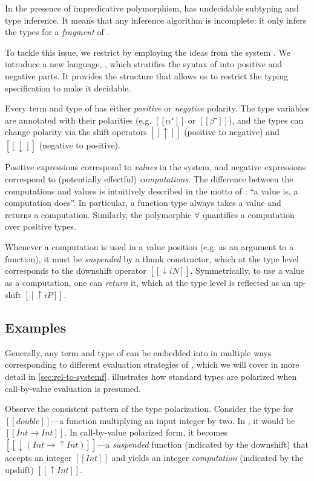 \label{sec:overview}

In the presence of impredicative polymorphism, \systemf has
undecidable subtyping and type inference. It means that any inference algorithm
is incomplete: it only infers the types for a \emph{fragment} of \systemf. 

To tackle this issue, we restrict \systemf by employing the ideas from the \CBPV
system \cite{levy2006:cbpv}. We introduce a new language, \fexists, which
stratifies the syntax of \systemf into positive and negative parts. It provides
the structure that allows us to restrict the typing specification to make it
decidable.

Every term and type of \fexists has either \emph{positive} or \emph{negative}
polarity. The type variables are annotated with their polarities (e.g. $[[α⁺]]$
or $[[β⁻]]$), and the types can change polarity via the shift operators $[[↑]]$
(positive to negative) and $[[↓]]$ (negative to positive).

Positive expressions correspond to \emph{values} in the \CBPV system, and
negative expressions correspond to (potentially effectful) \emph{computations}.
The difference between the computations and values is intuitively described in
the motto of \CBPV: ``a value is, a computation does''. In particular, a
function type always takes a value and returns a computation. Similarly, the
polymorphic $\forall$ quantifies a computation over positive types. 

Whenever a computation is used in a value position (e.g. as an argument to a
function), it must be \emph{suspended} by a thunk constructor, which at the
type level corresponds to the downshift operator $[[↓iN]]$.
Symmetrically, to use a value as a computation, one can \emph{return} it,
which at the type level is reflected as an up-shift $[[↑iP]]$.

\subsection{Examples}

Generally, any term and type of \systemf can be embedded into \fexists in
multiple ways corresponding to different evaluation strategies of \systemf,
which we will cover in more detail in \cref{sec:rel-to-systemf}.
 illustrates how standard \systemf types are
polarized when call-by-value evaluation is presumed.

Observe the consistent pattern of the type polarization. Consider the type for
$[[double]]$---a function multiplying an input integer by two. In \systemf, it
would be $[[Int → Int]]$. In call-by-value polarized form, it becomes $[[↓(Int →
↑Int)]]$---a \emph{suspended} function (indicated by the downshift) that accepts
an integer $[[Int]]$ and yields an integer \emph{computation} (indicated by the
upshift) $[[↑Int]]$. 

